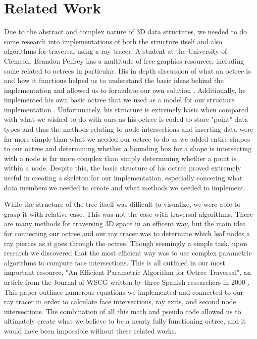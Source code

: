 \section{Related Work}

\par Due to the abstract and complex nature of 3D data structures, we needed to do some research into implementations of both the structure itself and also algorithms for traversal using a ray tracer. A student at the University of Clemson, Brandon Pelfrey has a multitude of free graphics resources, including some related to octrees in particular. His in depth discussion of what an octree is and how it functions helped us to understand the basic ideas behind the implementation and allowed us to formulate our own solution \cite{octree}. Additionally, he implemented his own basic octree that we used as a model for our structure implementation \cite{octreecode}. Unfortunately, his structure is extremely basic when compared with what we wished to do with ours as his octree is coded to store "point" data types and thus the methods relating to node intersections and inserting data were far more simple than what we needed our octree to do as we added entire shapes to our octree and determining whether a bounding box for a shape is intersecting with a node is far more complex than simply determining whether a point is within a node. Despite this, the basic structure of his octree proved extremely useful in creating a skeleton for our implementation, especially concering what data members we needed to create and what methods we needed to implement.
\par While the structure of the tree itself was difficult to visualize, we were able to grasp it with relative ease. This was not the case with traversal algorithms. There are many methods for traversing 3D space in an efficent way, but the main idea for connecting our octree and our ray tracer was to determine which leaf nodes a ray pierces as it goes through the octree. Though seemingly a simple task, upon research we discovered that the most efficient way was to use complex parametric algorithms to compute face intersections. This is all outlined in our most important resource, "An Efficient Parametric Algorithm for Octree Traversal", an article from the Journal of WSCG written by three Spanish researchers in 2000 \cite{traversal}. This paper outlines numerous equations we implemented and connected to our ray tracer in order to calculate face intersections, ray exits, and second node intersections. The combination of all this math and pseudo code allowed us to ultimately create what we believe to be a nearly fully functioning octree, and it would have been impossible without these related works.





